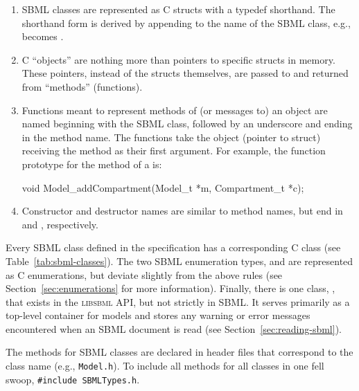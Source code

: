 \documentclass{cekmanual}
\begin{document}
\begin{enumerate}

  \item SBML classes are represented as C structs with a typedef
  shorthand.  The shorthand form is derived by appending 
  to the name of the SBML class, e.g.,  becomes
  .

  \item C ``objects'' are nothing more than pointers to specific
  structs in memory.  These pointers, instead of the structs
  themselves, are passed to and returned from ``methods'' (functions).

  \item Functions meant to represent methods of (or messages to) an
  object are named beginning with the SBML class, followed by an
  underscore and ending in the method name.  The functions take the
  object (pointer to struct) receiving the method as their first
  argument.  For example, the function prototype for the
   method of a  is:

    \begin{example}[c]
    void Model_addCompartment(Model_t *m, Compartment_t *c);
    \end{example}

  \item Constructor and destructor names are similar to method names,
  but end in  and , respectively.

\end{enumerate}


Every SBML class defined in the specification has a corresponding C
class (see Table~\ref{tab:sbml-classes}).  The two SBML enumeration
types,  and  are represented as C
enumerations, but deviate slightly from the above rules (see
Section~\ref{sec:enumerations} for more information).  Finally, there
is one class, , that exists in the
\textsc{libsbml} API, but not strictly in SBML.  It serves primarily
as a top-level container for models and stores any warning or error
messages encountered when an SBML document is read (see
Section~\ref{sec:reading-sbml}).

The methods for SBML classes are declared in header files that
correspond to the class name (e.g., \texttt{Model.h}).  To include all
methods for all classes in one fell swoop, \texttt{\#include
SBMLTypes.h}.
\end{document}
